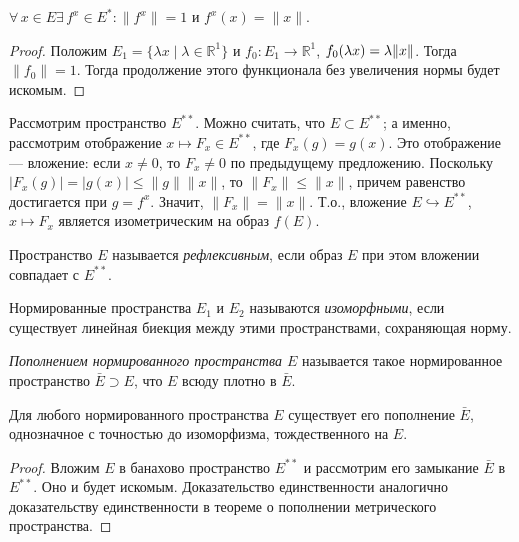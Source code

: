 \documentclass[10pt]{article}
\newcommand*{\p}[1]{#1\nobreak\discretionary{}{\hbox{$\mathsurround=0pt #1$}}{}}
\begin{document}
\begin{prop}
$\forall\,x\in E$\;\;$\exists\,f^x\in E^*:\|f^x\|=1$ и
$f^x(x)=\|x\|$.
\end{prop}

\begin{proof}
Положим $E_1=\{\lambda x\mid \lambda\in\mathbb{R}^1\}$ и $f_0\colon
E_1\to\mathbb{R}^1$, $f_0(\lambda x)\p=\lambda\|x\|$. Тогда
$\|f_0\|=1$. Тогда продолжение этого функционала без увеличения
нормы будет искомым.
\end{proof}

Рассмотрим пространство $E^{**}$. Можно считать, что $E\subset
E^{**}$; а именно, рассмотрим отображение $x\mapsto F_x\in E^{**}$,
где $F_x(g)=g(x)$. Это отображение --- вложение: если $x\neq 0$, то
$F_x\neq 0$ по предыдущему предложению. Поскольку
$|F_x(g)|=|g(x)|\leqslant \|g\|\|x\|$, то $\|F_x\|\leqslant \|x\|$,
причем равенство достигается при $g=f^x$. Значит, $\|F_x\|=\|x\|$.
Т.о., вложение $E\hookrightarrow E^{**}$, $x\mapsto F_x$ является
изометрическим на образ $f(E)$.

\begin{df}
Пространство $E$ называется \emph{рефлексивным}, если образ $E$ при
этом вложении совпадает с $E^{**}$.
\end{df}

\begin{df}
Нормированные пространства $E_1$ и $E_2$ называются
\emph{изоморфными}, если существует линейная биекция между этими
пространствами, сохраняющая норму.
\end{df}

\begin{df}
\emph{Пополнением нормированного пространства $E$} называется такое
нормированное пространство $\bar{E}\supset E$, что $E$ всюду плотно
в $\bar{E}$.
\end{df}

\begin{theorem}
Для любого нормированного пространства $E$ существует его пополнение
$\bar{E}$, однозначное с точностью до изоморфизма, тождественного на
$E$.
\end{theorem}

\begin{proof}
Вложим $E$ в банахово пространство $E^{**}$ и рассмотрим его
замыкание $\bar{E}$ в $E^{**}$. Оно и будет искомым. Доказательство
единственности аналогично доказательству единственности в теореме о
пополнении метрического пространства.
\end{proof}
\end{document}
